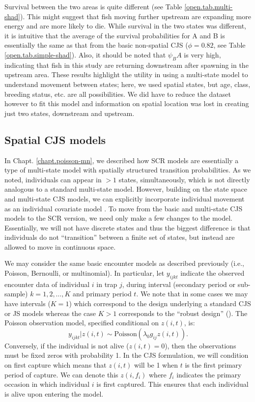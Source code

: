Survival between the two areas is quite different (see Table \ref{open.tab.multi-shad}).  This might suggest that
fish moving further upstream are expanding more energy and are more likely to die.
While survival in the two states was different, it is intuitive that the average of the survival
probabilities for A and B is essentially the same as that from the
basic non-spatial CJS ($\phi = 0.82$, see Table
\ref{open.tab.simple-shad}).   Also, it should be noted
that $\psi_BA$ is very high, indicating that fish in this study are
returning downstream after spawning in the upstream area.
These results highlight the utility in using a multi-state model to understand movement between states; here,
we used spatial states, but age, class, breeding status, etc. are all possibilities.  We did have to reduce the
dataset however to fit this model and information on spatial location was lost in creating just two states, downstream and upstream.

\subsection{Spatial CJS models}

In Chapt. \ref{chapt.poisson-mn}, we described how SCR models are
essentially a type of multi-state model with spatially structured transition probabilities.
As we noted, individuals can appear in $>1$ states, simultaneously,
which is not directly analogous to a standard multi-state model.  However, building on the state space and
multi-state CJS models, we can
explicitly incorporate individual movement as an
individual covariate model \citep{royle_indcov:2007}.
To move from the basic and multi-state CJS models to the SCR version, we need only make a few
changes to the model.  Essentially, we will not have discrete states and thus the biggest
difference is that individuals do not ``transition'' between a finite set of states, but
instead are allowed to move in continuous space.

We may consider the same basic encounter
models as described previously (i.e., Poisson, Bernoulli, or
multinomial). In particular, let $y_{ijkt}$ indicate the observed
encounter data of individual $i$ in trap $j$, during interval
(secondary period or sub-sample) $k=1,2,\ldots,K$ and primary period $t$. We note that in
some cases we may have intervals ($K=1$) which correspond to the
design underlying a standard CJS or JS models whereas the case $K>1$
corresponds to the ``robust design'' (\citealt{pollock:1982}).  The
Poisson observation model, specified conditional on $z(i,t)$, is:
 \[
  y_{ijkt}|z(i,t) \sim
\mbox{Poisson}(\lambda_0 g_{ij} z(i,t)).
\]
Conversely, if the
individual is not alive ($z(i,t)=0$), then the observations must be
fixed zeros with probability 1.   In the CJS formulation, we will condition on first capture
which means that $z(i,t)$ will
be 1 when $t$ is the first primary period of capture.  We can denote this $z(i, f_i)$
where $f_i$ indicates the primary occasion in which individual $i$ is first captured.
This ensures that each individual is alive upon entering the model.

